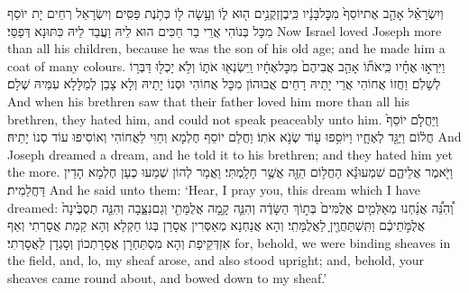 {וְיִשְׂרָאֵ֗ל אָהַ֤ב אֶת\maqqaf יוֹסֵף֙ מִכׇּל\maqqaf בָּנָ֔יו כִּֽי\maqqaf בֶן\maqqaf זְקֻנִ֥ים ה֖וּא ל֑וֹ וְעָ֥שָׂה ל֖וֹ כְּתֹ֥נֶת פַּסִּֽים׃}
{וְיִשְׂרָאֵל רְחֵים יָת יוֹסֵף מִכָּל בְּנוֹהִי אֲרֵי בַר חַכִּים הוּא לֵיהּ וַעֲבַד לֵיהּ כִּתּוּנָא דְּפַסֵּי׃}
{Now Israel loved Joseph more than all his children, because he was the son of his old age; and he made him a coat of many colours.}{}
{וַיִּרְא֣וּ אֶחָ֗יו כִּֽי\maqqaf אֹת֞וֹ אָהַ֤ב אֲבִיהֶם֙ מִכׇּל\maqqaf אֶחָ֔יו וַֽיִּשְׂנְא֖וּ אֹת֑וֹ וְלֹ֥א יָכְל֖וּ דַּבְּר֥וֹ לְשָׁלֹֽם׃}
{וַחֲזוֹ אֲחוֹהִי אֲרֵי יָתֵיהּ רָחֵים אֲבוּהוֹן מִכָּל אֲחוֹהִי וּסְנוֹ יָתֵיהּ וְלָא צָבַן לְמַלָּלָא עִמֵּיהּ שְׁלָם׃}
{And when his brethren saw that their father loved him more than all his brethren, they hated him, and could not speak peaceably unto him.}{}
{וַיַּחֲלֹ֤ם יוֹסֵף֙ חֲל֔וֹם וַיַּגֵּ֖ד לְאֶחָ֑יו וַיּוֹסִ֥פוּ ע֖וֹד שְׂנֹ֥א אֹתֽוֹ׃}
{וַחֲלַם יוֹסֵף חֶלְמָא וְחַוִּי לַאֲחוֹהִי וְאוֹסִיפוּ עוֹד סְנוֹ יָתֵיהּ׃}
{And Joseph dreamed a dream, and he told it to his brethren; and they hated him yet the more.}{}
{וַיֹּ֖אמֶר אֲלֵיהֶ֑ם שִׁמְעוּ\maqqaf נָ֕א הַחֲל֥וֹם הַזֶּ֖ה אֲשֶׁ֥ר חָלָֽמְתִּי׃}
{וַאֲמַר לְהוֹן שְׁמַעוּ כְעַן חֶלְמָא הָדֵין דַּחֲלַמִית׃}
{And he said unto them: ‘Hear, I pray you, this dream which I have dreamed:}{}
{וְ֠הִנֵּ֠ה אֲנַ֜חְנוּ מְאַלְּמִ֤ים אֲלֻמִּים֙ בְּת֣וֹךְ הַשָּׂדֶ֔ה וְהִנֵּ֛ה קָ֥מָה אֲלֻמָּתִ֖י וְגַם\maqqaf נִצָּ֑בָה וְהִנֵּ֤ה תְסֻבֶּ֙ינָה֙ אֲלֻמֹּ֣תֵיכֶ֔ם וַתִּֽשְׁתַּחֲוֶ֖יןָ לַאֲלֻמָּתִֽי׃}
{וְהָא אֲנַחְנָא מְאַסְּרִין אֲסָרַן בְּגוֹ חַקְלָא וְהָא קַמַת אֲסָרְתִי וְאַף אִזְדְּקֵיפַת וְהָא מִסְתַּחְרָן אֲסָרָתְכוֹן וְסָגְדָן לַאֲסָרְתִי׃}
{for, behold, we were binding sheaves in the field, and, lo, my sheaf arose, and also stood upright; and, behold, your sheaves came round about, and bowed down to my sheaf.’}{}

